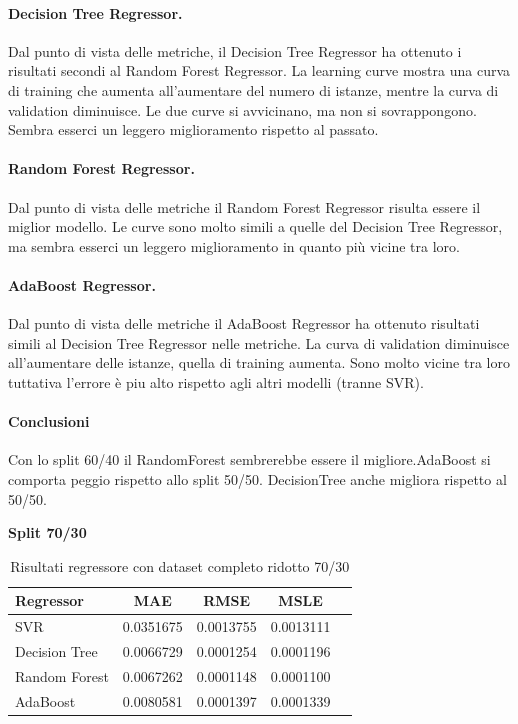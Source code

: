 \paragraph{\textbf{Decision Tree Regressor}.}
Dal punto di vista delle metriche, il Decision Tree Regressor ha ottenuto i risultati secondi al Random Forest Regressor. 
La learning curve mostra una curva di training che aumenta all'aumentare del numero di istanze, mentre la curva di validation diminuisce. Le due curve si avvicinano, ma non si sovrappongono. Sembra esserci un leggero miglioramento rispetto al passato.
\paragraph{\textbf{Random Forest Regressor}.}
Dal punto di vista delle metriche il Random Forest Regressor risulta essere il miglior modello.
Le curve sono molto simili a quelle del Decision Tree Regressor, ma sembra esserci un leggero miglioramento in quanto più vicine tra loro.
\paragraph{\textbf{AdaBoost Regressor}.}
Dal punto di vista delle metriche il AdaBoost Regressor ha ottenuto risultati simili al Decision Tree Regressor nelle metriche. La curva di validation diminuisce all'aumentare delle istanze, quella di training aumenta. Sono molto vicine tra loro tuttativa l'errore è piu alto rispetto agli altri modelli (tranne SVR).

\paragraph{\textbf{Conclusioni}} Con lo split 60/40 il RandomForest sembrerebbe essere il migliore.AdaBoost si comporta peggio rispetto allo split 50/50. DecisionTree anche migliora rispetto al 50/50.

\noindent\textbf{Split 70/30}


\begin{table}[H]
    \centering
    \begin{tabular}{|>{\centering\arraybackslash}m{5cm}|c|c|c|c|}
        \hline
        \textbf{Regressor} & \textbf{MAE} & \textbf{RMSE} & \textbf{MSLE} \\ [10pt]
        \hline
        SVR & 0.0351675 & 0.0013755 & 0.0013111 \\ [10pt]
        \hline
        Decision Tree & 0.0066729 & 0.0001254 & 0.0001196 \\ [10pt]
        \hline
        Random Forest & 0.0067262 & 0.0001148 & 0.0001100 \\ [10pt]
        \hline
        AdaBoost & 0.0080581 & 0.0001397 & 0.0001339 \\ [10pt]
        \hline
    \end{tabular}
    \caption{Risultati regressore con dataset completo ridotto 70/30}
    \label{tab:results}
\end{table}

